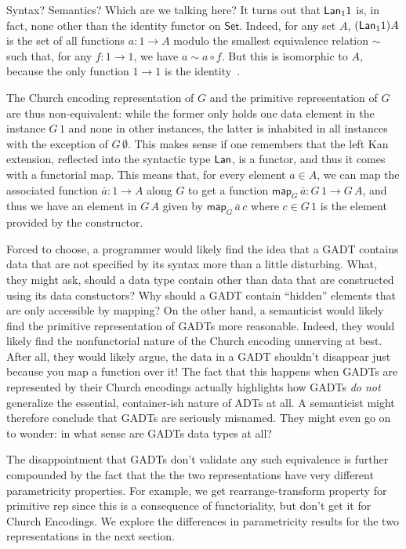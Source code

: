 \documentclass[acmsmall,screen,review,anonymous]{acmart}
\theoremstyle{definition}
\newcommand{\set}{\mathsf{Set}}
\newcommand{\map}{\mathsf{map}}
\begin{document}
\begin{example}
{\color{red} Syntax? Semantics? Which are we talking here?}
It turns out that $\mathsf{\mathsf{Lan}}_1 1$ is, in fact, none other than the
identity functor on $\set$.  Indeed, for any set $A$,
$(\mathsf{\mathsf{Lan}}_1 1) A$ is the set of all functions $a : 1 \to A$
modulo the smallest equivalence relation $\sim$ such that, for any $f
: 1 \to 1$, we have $a \sim a \circ f$.  But this is isomorphic to
$A$, because the only function $1 \to 1$ is the identity~\cite{blw03}.

The Church encoding representation of $G$ and the primitive
representation of $G$ are thus non-equivalent: while the former only
holds one data element in the instance $G\,1$ and none in other
instances, the latter is inhabited in all instances with the exception
of $G\,\emptyset$.  This makes sense if one remembers that the left
Kan extension, reflected into the syntactic type $\mathsf{Lan}$, is a functor,
and thus it comes with a functorial map.  This means that, for every
element $a \in A$, we can map the associated function $\bar{a} : 1 \to
A$ along $G$ to get a function $\map_{G}\,\bar{a} : G\,1 \to G\,A$,
and thus we have an element in $G\,A$ given by $\map_{G}\,\bar{a}\, c$
where $c \in G\,1$ is the element provided by the constructor.
\end{example}

Forced to choose, a programmer would likely find the idea that a GADT
contains data that are not specified by its syntax more than a little
disturbing. What, they might ask, should a data type contain other
than data that are constructed using its data constuctors? Why should
a GADT contain ``hidden'' elements that are only accessible by
mapping? On the other hand, a semanticist would likely find the
primitive representation of GADTs more reasonable. Indeed, they would
likely find the nonfunctorial nature of the Church encoding unnerving
at best. After all, they would likely argue, the data in a GADT
shouldn't disappear just because you map a function over it! The fact
that this happens when GADTs are represented by their Church encodings
actually highlights how GADTs {\em do not} generalize the essential,
container-ish nature of ADTs at all. A semanticist might therefore
conclude that GADTs are seriously misnamed. They might even go on to
wonder: in what sense are GADTs data types at all?

The disappointment that GADTs don't validate any such equivalence is
further compounded by the fact that the the two representations have
very different parametricity properties.  {\color{blue} For example,
  we get rearrange-transform property for primitive rep since this is
  a consequence of functoriality, but don't get it for Church
  Encodings.} We explore the differences in parametricity results for
the two representations in the next section.
\end{document}
